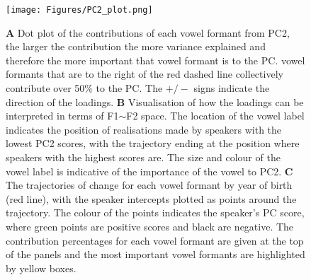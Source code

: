 \documentclass[review]{elsarticle} %
\begin{document}
\begin{figure}[!p]
\texttt{[image: Figures/PC2\_plot.png]}
\caption{\textbf{A} Dot plot of the contributions of each vowel formant from PC2, the larger the contribution the more variance explained and therefore the more important that vowel formant is to the PC. vowel formants that are to the right of the red dashed line collectively contribute over 50\% to the PC. The $+/-$ signs indicate the direction of the loadings. \textbf{B} Visualisation of how the loadings can be interpreted in terms of F1$\sim$F2 space. The location of the vowel label indicates the position of realisations made by speakers with the lowest PC2 scores, with the trajectory ending at the position where speakers with the highest scores are. The size and colour of the vowel label is indicative of the importance of the vowel to PC2. \textbf{C} The trajectories of change for each vowel formant by year of birth (red line), with the speaker intercepts plotted as points around the trajectory. The colour of the points indicates the speaker's PC score, where green points are positive scores and black are negative. The contribution percentages for each vowel formant are given at the top of the panels and the most important vowel formants are highlighted by yellow boxes.}
\label{fig:PC2_variable_loadings}
\end{figure}

\end{document}
